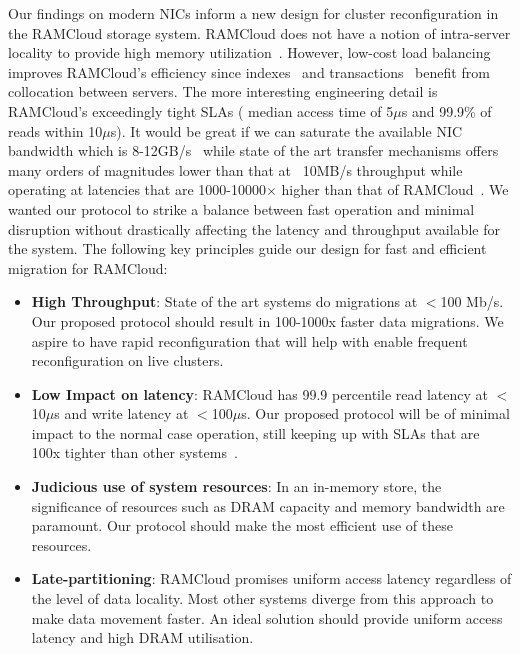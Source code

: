 Our findings on modern NICs inform a new design for cluster reconfiguration
in the RAMCloud storage system. RAMCloud does not have a notion of intra-server locality 
 to provide high memory utilization~\cite{ramcloudfast}. However, low-cost load balancing improves RAMCloud’s
efficiency since indexes~\cite{slik} and transactions~\cite{ramcloudtx} benefit from collocation between servers.
The more interesting engineering detail is RAMCloud’s exceedingly tight SLAs ( median
access time of 5$\mu$s and 99.9\% of reads within 10$\mu$s). It would be great if we can saturate the
available NIC bandwidth which is 8-12GB/s~\cite{cx3,cx4} while state of the art 
transfer mechanisms offers many orders of magnitudes lower than that at ~10MB/s 
throughput while operating at latencies that are 1000-10000$\times$ higher than that of RAMCloud~\cite{ramcloud}.
We wanted our protocol to strike a balance between fast operation and minimal disruption without drastically affecting
the latency and throughput available for the system. The following key principles guide our design for fast and 
efficient migration for RAMCloud:
\begin{itemize}
\item{\textbf{High Throughput}}: State of the art systems do migrations at $<$100 Mb/s. Our proposed protocol
should result in 100-1000x faster data migrations. We aspire to have rapid reconfiguration that will 
help with enable frequent reconfiguration on live clusters.
\item{\textbf{Low Impact on latency}}: RAMCloud has 99.9 percentile read latency at $<$10$\mu$s and write latency
at $<$100$\mu$s. Our proposed protocol will be of minimal impact to the normal case operation, still keeping
up with SLAs that are 100x tighter than other systems~\cite{squall}.
\item{\textbf{Judicious use of system resources}}: In an in-memory store, the significance of resources such as DRAM capacity and
memory bandwidth are paramount. Our protocol should make the most efficient use of these resources.
\item{\textbf{Late-partitioning}}: RAMCloud promises uniform access latency regardless of the level of data locality.
Most other systems diverge from this approach to make data movement faster. An ideal solution should provide 
uniform access latency and high DRAM utilisation.
\end{itemize}

